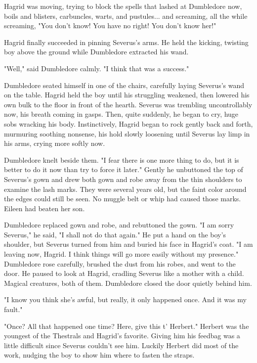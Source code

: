 Hagrid was moving, trying to block the spells that lashed at Dumbledore now, boils and blisters, carbuncles, warts, and pustules... and screaming, all the while screaming, "You don't know! You have no right! You don't know her!"

Hagrid finally succeeded in pinning Severus's arms. He held the kicking, twisting boy above the ground while Dumbledore extracted his wand.

"Well," said Dumbledore calmly. "I think that was a success."

Dumbledore seated himself in one of the chairs, carefully laying Severus's wand on the table. Hagrid held the boy until his struggling weakened, then lowered his own bulk to the floor in front of the hearth. Severus was trembling uncontrollably now, his breath coming in gasps. Then, quite suddenly, he began to cry, huge sobs wracking his body. Instinctively, Hagrid began to rock gently back and forth, murmuring soothing nonsense, his hold slowly loosening until Severus lay limp in his arms, crying more softly now.

Dumbledore knelt beside them. "I fear there is one more thing to do, but it is better to do it now than try to force it later." Gently he unbuttoned the top of Severus's gown and drew both gown and robe away from the thin shoulders to examine the lash marks. They were several years old, but the faint color around the edges could still be seen. No muggle belt or whip had caused those marks. Eileen had beaten her son.

Dumbledore replaced gown and robe, and rebuttoned the gown. "I am sorry Severus," he said, "I shall not do that again." He put a hand on the boy's shoulder, but Severus turned from him and buried his face in Hagrid's coat. "I am leaving now, Hagrid. I think things will go more easily without my presence." Dumbledore rose carefully, brushed the dust from his robes, and went to the door. He paused to look at Hagrid, cradling Severus like a mother with a child. Magical creatures, both of them. Dumbledore closed the door quietly behind him.

"I know you think she's awful, but really, it only happened once. And it was my fault."

"Once? All that happened one time? Here, give this t' Herbert." Herbert was the youngest of the Thestrals and Hagrid's favorite. Giving him his feedbag was a little difficult since Severus couldn't see him. Luckily Herbert did most of the work, nudging the boy to show him where to fasten the straps.

